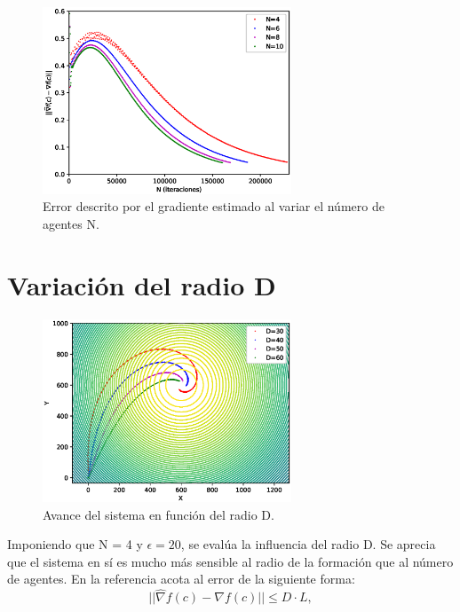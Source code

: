 \begin{figure}[H]
\centering
\includegraphics[width=0.66\textwidth]{figures/Graficas_Nuevas/N/Figure_5.eps}
\caption{Error descrito por el gradiente estimado al variar el número de agentes N.} \label{N_Var_Error}
\end{figure}

\section{Variación del radio D}

\begin{figure}[H]
\centering
\includegraphics[width=0.66\textwidth]{figures/Dif_R_BU/Figure_1.eps}
\caption{Avance del sistema en función del radio D.} \label{D_Var}
\end{figure}

Imponiendo que N = 4 y $\epsilon=20$, se evalúa la influencia del radio D. Se aprecia que el sistema en sí es mucho más sensible al radio de la formación que al número de agentes. En la referencia \cite{Adicional_Estimacion_1} acota al error de la siguiente forma:
\begin{equation}\label{Depe}
	||\hat{\nabla}f\left(c\right)-\nabla{f}\left(c\right)||\leqslant{D·L},
\end{equation}

